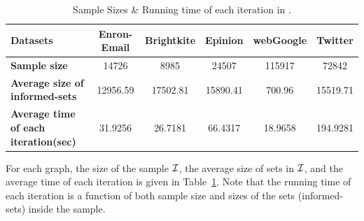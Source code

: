 

\begin{table}[htb]
\begin{tabular}{|l|c|c|c|c|c|}
\hline
{\bf Datasets}& Enron-Email & Brightkite & Epinion  & webGoogle & Twitter\\
\hline \hline
{\bf Sample size}& 14726 & 8985 & 24507 & 115917 & 72842 \\
\hline
{\bf Average size of informed-sets}& 12956.59 & 17502.81 & 15890.41 & 700.96  & 15519.71 \\
\hline
{\bf Average time of each iteration(sec)}& 31.9256 & 26.7181&  66.4317&  18.9658&  194.9281\\
\hline
\end{tabular}
\caption{Sample Sizes \& Running time of each iteration in \algonameapx.}\label{table:time}
\end{table}


For each graph, the size of the sample $\mathcal{I}$, the average size of sets in
$\mathcal{I}$, and the average time of each iteration is given in
Table~\ref{table:time}. Note that the running time of each iteration is a
function of both sample size and sizes of the sets (informed-sets) inside the
sample.


